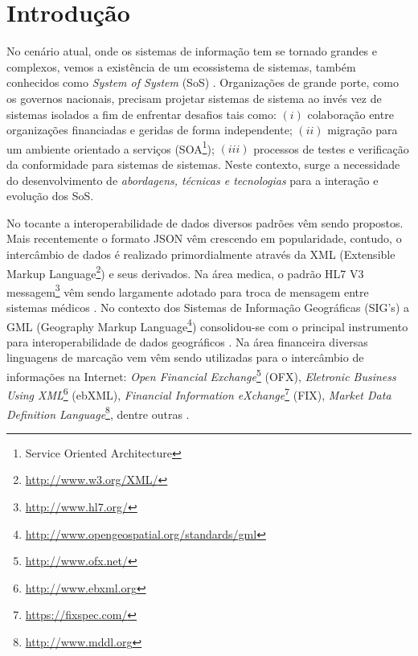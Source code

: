 \documentclass[msc,proposal]{ppgccufmg} %
\begin{document}
\chapter{Introdução}
\label{ch:Contexto}
No cenário atual, onde os sistemas de informação tem se tornado grandes e complexos, vemos a existência de um ecossistema de sistemas, também conhecidos como \textit{System of System} (SoS) \cite{Nakagawa:2013:SAF:2489850.2489853}. Organizações de grande porte, como os governos nacionais, precisam projetar sistemas de sistema ao invés vez de sistemas isolados a fim de enfrentar desafios tais como: $(i)$ colaboração entre organizações financiadas e geridas de forma independente; $(ii)$ migração para um ambiente orientado a serviços (SOA\footnote{Service Oriented Architecture }); $(iii)$ processos de testes e verificação da conformidade para sistemas de sistemas. Neste contexto, surge a necessidade do desenvolvimento de \textit{abordagens, técnicas e tecnologias} para a interação e evolução dos SoS.
     
No tocante a interoperabilidade de dados diversos padrões vêm sendo propostos. Mais recentemente o formato JSON \cite{RFC4627} vêm crescendo em popularidade, contudo, o intercâmbio de dados é realizado primordialmente através da XML (Extensible Markup Language\footnote{\url{http://www.w3.org/XML/}}) e seus derivados. Na área medica, o padrão HL7 V3 messagem\footnote{\url{http://www.hl7.org/}} vêm sendo largamente adotado para troca de mensagem entre sistemas médicos \cite{Andrikopoulos:2013:TEO:2491845.2491890}{}. No contexto dos Sistemas de Informação Geográficas (SIG's) a GML (Geography Markup Language\footnote{\url{http://www.opengeospatial.org/standards/gml}}) consolidou-se com o principal instrumento para interoperabilidade de dados geográficos \cite{gmlpaper}{}. Na área financeira diversas linguagens de marcação vem vêm sendo utilizadas para o intercâmbio de informações na Internet: \textit{Open Financial Exchange}\footnote{\url{http://www.ofx.net/}} (OFX), \textit{Eletronic Business Using XML}\footnote{\url{http://www.ebxml.org}} (ebXML), \textit{Financial Information eXchange}\footnote{\url{https://fixspec.com/}} (FIX), \textit{Market Data Definition Language}\footnote{\url{http://www.mddl.org}}, dentre outras \cite{xbrl_conceitos_aplicacoes}{}.
\end{document}
